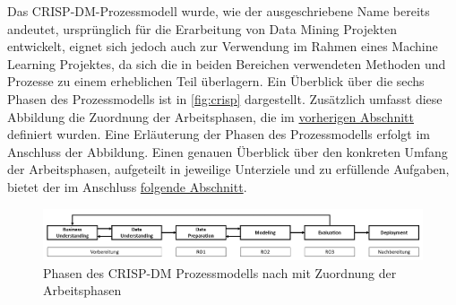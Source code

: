 Das CRISP-DM-Prozessmodell wurde, wie der ausgeschriebene Name bereits andeutet, ursprünglich für die Erarbeitung von Data Mining Projekten entwickelt, eignet sich jedoch auch zur Verwendung im Rahmen eines Machine Learning Projektes, da sich die in beiden Bereichen verwendeten Methoden und Prozesse zu einem erheblichen Teil überlagern. Ein Überblick über die sechs Phasen des Prozessmodells ist in \autoref{fig:crisp} dargestellt. Zusätzlich umfasst diese Abbildung die Zuordnung der Arbeitsphasen, die im \hyperref[phases_definition]{vorherigen Abschnitt} definiert wurden. Eine Erläuterung der Phasen des Prozessmodells erfolgt im Anschluss der Abbildung. Einen genauen Überblick über den konkreten Umfang der Arbeitsphasen, aufgeteilt in jeweilige Unterziele und zu erfüllende Aufgaben, bietet der im Anschluss \hyperref[timecourse] {folgende Abschnitt}. 

\begin{figure}[H]
    \centering
    \includegraphics[width=\textwidth]{images/CRISP-DM}
    \caption{Phasen des CRISP-DM Prozessmodells nach \cite{Chapman2000} mit Zuordnung der Arbeitsphasen}\label{fig:crisp}
\end{figure}


